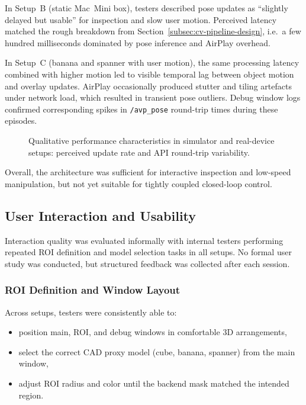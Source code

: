 In Setup~B (static Mac~Mini box), testers described pose updates as “slightly delayed but usable” for inspection and slow user motion. Perceived latency matched the rough breakdown from Section~\ref{subsec:cv-pipeline-design}, i.e.\ a few hundred milliseconds dominated by pose inference and AirPlay overhead.  

In Setup~C (banana and spanner with user motion), the same processing latency combined with higher motion led to visible temporal lag between object motion and overlay updates. AirPlay occasionally produced stutter and tiling artefacts under network load, which resulted in transient pose outliers. Debug window logs confirmed corresponding spikes in \texttt{/avp\_pose} round-trip times during these episodes.

\begin{figure}[H]
    \centering
    \caption[Prototype performance characteristics]{Qualitative performance characteristics in simulator and real-device setups: perceived update rate and API round-trip variability.}
    \label{fig:performanceplot}
\end{figure}

Overall, the architecture was sufficient for interactive inspection and low-speed manipulation, but not yet suitable for tightly coupled closed-loop control.

\subsection{User Interaction and Usability}

Interaction quality was evaluated informally with internal testers performing repeated ROI definition and model selection tasks in all setups. No formal user study was conducted, but structured feedback was collected after each session.

\subsubsection{ROI Definition and Window Layout}

Across setups, testers were consistently able to:

\begin{itemize}
    \item position main, ROI, and debug windows in comfortable 3D arrangements,
    \item select the correct CAD proxy model (cube, banana, spanner) from the main window,
    \item adjust ROI radius and color until the backend mask matched the intended region.
\end{itemize}

